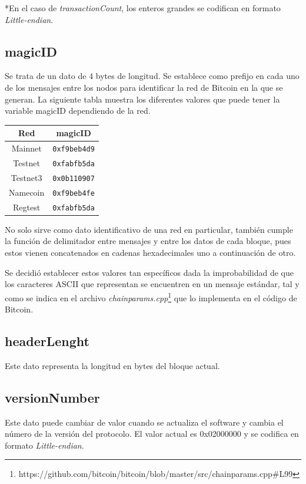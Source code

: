 \documentclass{article}
\begin{document}
    *En el caso de \textit{transactionCount}, los enteros grandes se codifican en formato \textit{Little-endian}.
    
    \subsection{magicID}
    Se trata de un dato de 4 bytes de longitud. Se establece como prefijo en cada uno de los mensajes entre los nodos para identificar la red de Bitcoin en la que se generan. La siguiente tabla muestra los diferentes valores que puede tener la variable magicID dependiendo de la red.
    
    \begin{table}[H]
    \centering
    \begin{tabular}{| c | c |} 
        \hline
        Red & magicID \\
        \hline
        Mainnet & \texttt{0xf9beb4d9} \\
        \hline
        Testnet & \texttt{0xfabfb5da} \\
        \hline
        Testnet3 & \texttt{0x0b110907} \\
        \hline
        Namecoin & \texttt{0xf9beb4fe} \\
        \hline
        Regtest & \texttt{0xfabfb5da} \\
        \hline
    \end{tabular}
    \label{table:1}
    \end{table}
    
    No solo sirve como dato identificativo de una red en particular, también cumple la función de delimitador entre mensajes y entre los datos de cada bloque, pues estos vienen concatenados en cadenas hexadecimales uno a continuación de otro.
    
    Se decidió establecer estos valores tan específicos dada la improbabilidad de que los caracteres ASCII que representan se encuentren en un mensaje estándar, tal y como se indica en el archivo \textit{chainparams.cpp}\footnote{https://github.com/bitcoin/bitcoin/blob/master/src/chainparams.cpp\#L99} que lo implementa en el código de Bitcoin.
    
    \subsection{headerLenght}
    Este dato representa la longitud en bytes del bloque actual.
    
    \subsection{versionNumber}
    Este dato puede cambiar de valor cuando se actualiza el software y cambia el número de la versión del protocolo. El valor actual es 0x02000000 y se codifica en formato \textit{Little-endian}.
    
\end{document}
